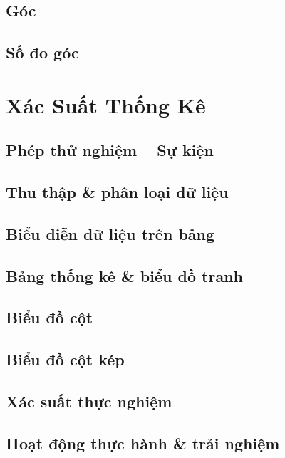 \documentclass{article}
\numberwithin{equation}{section}
\begin{document}
\subsection{Góc}

\subsection{Số đo góc}


\section{Xác Suất Thống Kê}

\subsection{Phép thử nghiệm -- Sự kiện}

\subsection{Thu thập \& phân loại dữ liệu}

\subsection{Biểu diễn dữ liệu trên bảng}

\subsection{Bảng thống kê \& biểu dồ tranh}

\subsection{Biểu đồ cột}

\subsection{Biểu đồ cột kép}

\subsection{Xác suất thực nghiệm}

\subsection{Hoạt động thực hành \& trải nghiệm}
\end{document}
